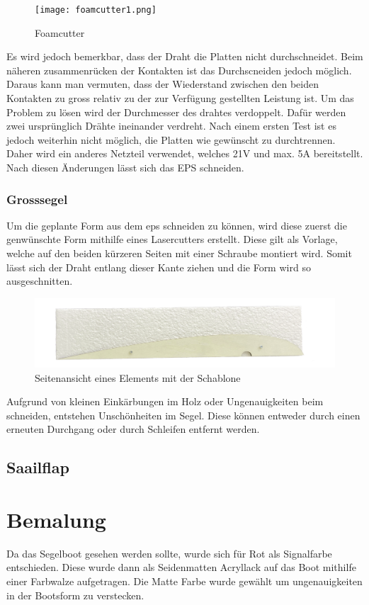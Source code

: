 \begin{figure}[H]
    \centering
    \texttt{[image: foamcutter1.png]}
    \caption{Foamcutter}
    \label{fig:enter-label}
\end{figure}

Es wird jedoch bemerkbar, dass der Draht die Platten nicht durchschneidet. Beim näheren zusammenrücken der Kontakten ist das Durchscneiden jedoch möglich. Daraus kann man vermuten, dass der Wiederstand zwischen den beiden Kontakten zu gross relativ zu der zur Verfügung gestellten Leistung ist. 
Um das Problem zu lösen wird der Durchmesser des drahtes verdoppelt. Dafür werden zwei ursprünglich Drähte ineinander verdreht. Nach einem ersten Test ist es jedoch weiterhin nicht möglich, die Platten wie gewünscht zu durchtrennen. Daher wird ein anderes Netzteil verwendet, welches 21V und max. 5A bereitstellt. Nach diesen Änderungen lässt sich das EPS schneiden. 

\subsubsection*{Grosssegel}
Um die geplante Form aus dem \ac{eps} schneiden zu können, wird diese zuerst die genwünschte Form mithilfe eines Lasercutters erstellt. Diese gilt als Vorlage, welche auf den beiden kürzeren Seiten mit einer Schraube montiert wird. Somit lässt sich der Draht entlang dieser Kante ziehen und die Form wird so ausgeschnitten. \\


\begin{figure}[H]
    \centering
    \includegraphics[width=1\linewidth]{assets/template_on_foam.png}
    \caption{Seitenansicht eines Elements mit der Schablone}
    \label{fig:enter-label}
\end{figure}

Aufgrund von kleinen Einkärbungen im Holz oder Ungenauigkeiten beim schneiden, entstehen Unschönheiten im Segel. Diese können entweder durch einen erneuten Durchgang oder durch Schleifen entfernt werden.
\subsection{Saailflap}

\section{Bemalung}
Da das Segelboot gesehen werden sollte, wurde sich für Rot als Signalfarbe entschieden. Diese wurde dann als Seidenmatten Acryllack auf das Boot mithilfe einer Farbwalze aufgetragen. Die Matte Farbe wurde gewählt um ungenauigkeiten in der Bootsform zu verstecken. 
